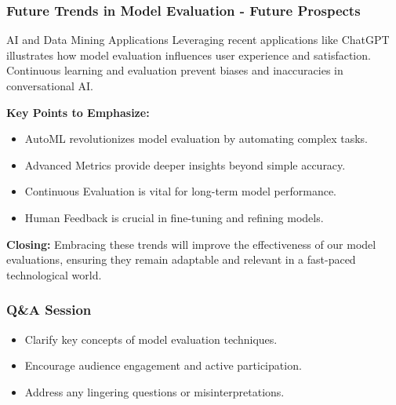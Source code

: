 \documentclass[aspectratio=169]{beamer}
\begin{document}
\begin{frame}[fragile]
    \frametitle{Future Trends in Model Evaluation - Future Prospects}
    \begin{block}{AI and Data Mining Applications}
        Leveraging recent applications like ChatGPT illustrates how model evaluation influences user experience and satisfaction. Continuous learning and evaluation prevent biases and inaccuracies in conversational AI.
    \end{block}
    
    \textbf{Key Points to Emphasize:}
    \begin{itemize}
        \item AutoML revolutionizes model evaluation by automating complex tasks.
        \item Advanced Metrics provide deeper insights beyond simple accuracy.
        \item Continuous Evaluation is vital for long-term model performance.
        \item Human Feedback is crucial in fine-tuning and refining models.
    \end{itemize}
    
    \textbf{Closing:} Embracing these trends will improve the effectiveness of our model evaluations, ensuring they remain adaptable and relevant in a fast-paced technological world.
\end{frame}

\begin{frame}[fragile]
    \frametitle{Q\&A Session}
    \begin{itemize}
        \item Clarify key concepts of model evaluation techniques.
        \item Encourage audience engagement and active participation.
        \item Address any lingering questions or misinterpretations.
    \end{itemize}
\end{frame}
\end{document}
